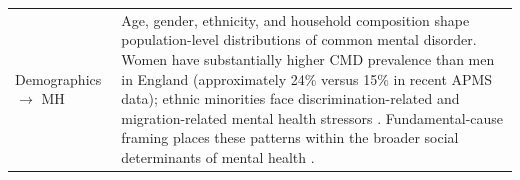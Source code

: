 \begin{longtable}{@{}p{3.5cm}p{11.5cm}@{}}
\addlinespace
Demographics $\to$ MH & Age, gender, ethnicity, and household composition shape population-level distributions of common mental disorder. Women have substantially higher CMD prevalence than men in England (approximately 24\% versus 15\% in recent APMS data); ethnic minorities face discrimination-related and migration-related mental health stressors \citep{nhs_england_digital_adult_2024, irizar_prevalence_2024}. Fundamental-cause framing places these patterns within the broader social determinants of mental health \citep{allen_social_2014}. \\
\end{longtable}



